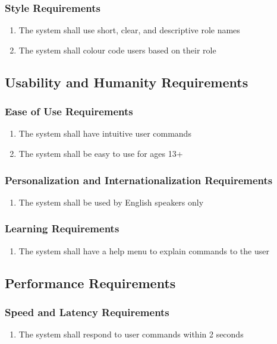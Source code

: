 \documentclass[12pt, titlepage]{article}
\begin{document}
\subsubsection{Style Requirements}
\begin{enumerate}[start=2, label={LF\arabic*.}]
    \item The system shall use short, clear, and descriptive role names
    \item The system shall colour code users based on their role
\end{enumerate}

\subsection{Usability and Humanity Requirements}
\subsubsection{Ease of Use Requirements}
\begin{enumerate}[start=1, label={UH\arabic*.}]
    \item The system shall have intuitive user commands
    \item The system shall be easy to use for ages 13+
\end{enumerate}
\subsubsection{Personalization and Internationalization Requirements}
\begin{enumerate}[start=3, label={UH\arabic*.}]
    \item The system shall be used by English speakers only
\end{enumerate}
\subsubsection{Learning Requirements}
\begin{enumerate}[start=4, label={UH\arabic*.}]
    \item The system shall have a help menu to explain commands to the user
\end{enumerate}

\subsection{Performance Requirements}
\subsubsection{Speed and Latency Requirements}
\begin{enumerate}[start=1, label={P\arabic*.}]
    \item The system shall respond to user commands within 2 seconds
\end{enumerate}
\end{document}
